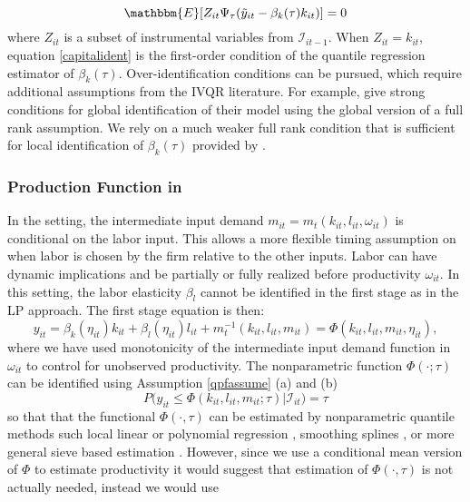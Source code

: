 \documentclass[11pt]{article}
\begin{document}
\begin{equation}\label{capitalident}
\mathbbm{E}[Z_{it}\Psi_{\tau}(\tilde{y}_{it}-\beta_{k}(\tau)k_{it})]=0
\end{equation}
where $Z_{it}$ is a subset of instrumental variables from $\mathcal{I}_{it-1}$. When $Z_{it}=k_{it}$, equation \eqref{capitalident} is the first-order condition of the quantile regression estimator of $\beta_{k}(\tau)$. Over-identification conditions can be pursued, which require additional assumptions from the IVQR literature. For example, \cite{Chernozhukov2005} give strong conditions for global identification of their model using the global version of a full rank assumption. We rely on a much weaker full rank condition that is sufficient for local identification of $\beta_{k}(\tau)$ provided by \cite{qgmm}.

\subsubsection{Production Function in \cite{Ackerberg2015}}
In the \cite{Ackerberg2015} setting, the intermediate input demand $m_{it}=m_{t}(k_{it}, l_{it}, \omega_{it})$ is conditional on the labor input. This allows a more flexible timing assumption on when labor is chosen by the firm relative to the other inputs. Labor can have dynamic implications and be partially or fully realized before productivity $\omega_{it}$. In this setting, the labor elasticity $\beta_{l}$ cannot be identified in the first stage as in the LP approach. The first stage equation is then:
\begin{equation}\label{acf1}
y_{it}=\beta_{k}(\eta_{it})k_{it}+\beta_{l}(\eta_{it})l_{it}+m_{t}^{-1}(k_{it}, l_{it}, m_{it})=\Phi(k_{it}, l_{it}, m_{it}, \eta_{it}),
\end{equation}
where we have used monotonicity of the intermediate input demand function in $\omega_{it}$ to control for unobserved productivity. The nonparametric function $\Phi(\cdot;\tau)$ can be identified using Assumption \eqref{qpfassume} (a) and (b)
\begin{equation} \label{acfqpf1}
P\big(y_{it}\leq \Phi(k_{it}, l_{it}, m_{it}; \tau)\big|\mathcal{I}_{it})=\tau
\end{equation}
so that that the functional $\Phi(\cdot, \tau)$ can be estimated by nonparametric quantile methods such local linear or polynomial regression \citep{Chaudhuri1991,Chaudhuri1991a}, smoothing splines \citep{KOENKER1994}, or more general sieve based estimation \citep{2012a}. However, since we use a conditional mean version of $\Phi$ to estimate productivity it would suggest that estimation of $\Phi(\cdot, \tau)$ is not actually needed, instead we would use
\end{document}
